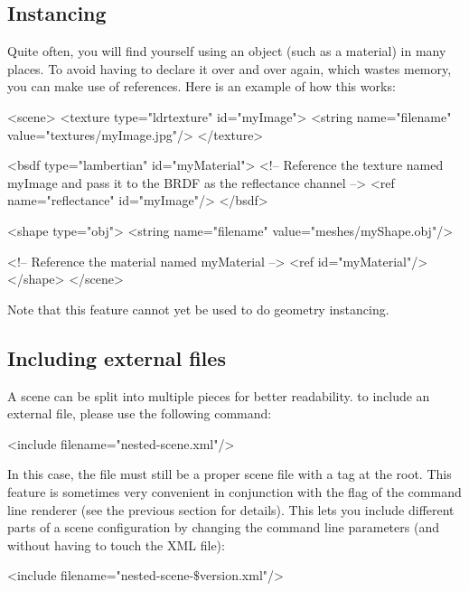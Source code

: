 \subsection{Instancing}
Quite often, you will find yourself using an object (such as a material) in many places. To avoid having
to declare it over and over again, which wastes memory, you can make use of references. Here is an example
of how this works:
\begin{xml}
<scene>
	<texture type="ldrtexture" id="myImage">
		<string name="filename" value="textures/myImage.jpg"/>
	</texture>

	<bsdf type="lambertian" id="myMaterial">
		<!-- Reference the texture named myImage and pass it 
			to the BRDF as the reflectance channel -->
		<ref name="reflectance" id="myImage"/>
	</bsdf>

	<shape type="obj">
		<string name="filename" value="meshes/myShape.obj"/>

		<!-- Reference the material named myMaterial -->
		<ref id="myMaterial"/>
	</shape>
</scene>
\end{xml}
Note that this feature cannot yet be used to do geometry instancing.
\subsection{Including external files}
A scene can be split into multiple pieces for better readability. 
to include an external file, please use the following command:
\begin{xml}
<include filename="nested-scene.xml"/>
\end{xml}
In this case, the file  must still be a proper scene file with a  tag at the root.
This feature is sometimes very convenient in conjunction with the  flag of the  command line renderer (see the previous section for details).
This lets you include different parts of a scene configuration by changing the command line parameters (and without having to touch the XML file):
\begin{xml}
<include filename="nested-scene-$\texttt{\$}$version.xml"/>
\end{xml}
